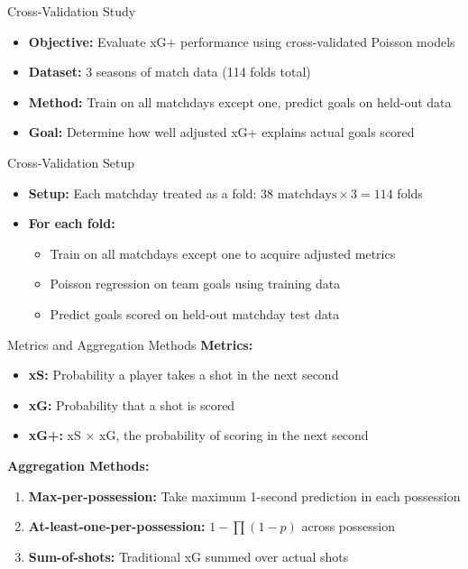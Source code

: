 \documentclass{beamer}
\begin{document}
\begin{frame}{Cross-Validation Study}
\begin{itemize}
\item \textbf{Objective:} Evaluate xG+ performance using cross-validated Poisson models
\item \textbf{Dataset:} 3 seasons of match data (114 folds total)
\item \textbf{Method:} Train on all matchdays except one, predict goals on held-out data
\item \textbf{Goal:} Determine how well adjusted xG+ explains actual goals scored
\end{itemize}
\end{frame}

\begin{frame}{Cross-Validation Setup}
\begin{itemize}
\item \textbf{Setup:} Each matchday treated as a fold: $38 \text{ matchdays} \times 3 = 114$ folds
\item \textbf{For each fold:}
  \begin{itemize}
  \item Train on all matchdays except one to acquire adjusted metrics
  \item Poisson regression on team goals using training data
  \item Predict goals scored on held-out matchday test data
  \end{itemize}
\end{itemize}
\end{frame}

\begin{frame}{Metrics and Aggregation Methods}
\textbf{Metrics:}
\begin{itemize}
\item \textbf{xS:} Probability a player takes a shot in the next second
\item \textbf{xG:} Probability that a shot is scored
\item \textbf{xG+:} xS $\times$ xG, the probability of scoring in the next second
\end{itemize}

\textbf{Aggregation Methods:}
\begin{enumerate}
\item \textbf{Max-per-possession:} Take maximum 1-second prediction in each possession
\item \textbf{At-least-one-per-possession:} $1 - \prod (1 - p)$ across possession
\item \textbf{Sum-of-shots:} Traditional xG summed over actual shots
\end{enumerate}
\end{frame}
\end{document}
